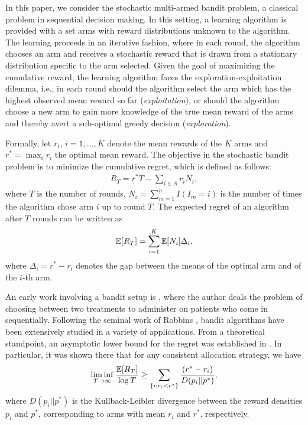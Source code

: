 In this paper, we consider the stochastic multi-armed bandit problem, a classical problem in sequential decision making. In this setting,  a learning algorithm is provided with a set arms with reward distributions unknown to the algorithm. The learning proceeds in an iterative fashion, where in each round, the algorithm chooses an arm and receives a stochastic reward that is drawn from a stationary distribution specific to the arm selected.  
Given the goal of maximizing the cumulative reward, the learning algorithm faces the exploration-exploitation dilemma, i.e., in each round should the algorithm select the arm which has the highest observed mean reward so far 
(\textit{exploitation}), or should the algorithm choose a new arm to gain more knowledge of the true mean reward of the arms and thereby avert a sub-optimal greedy decision (\textit{exploration}). 

Formally, let $r_i$, $i=1,\ldots,K$ denote the mean rewards of the $K$ arms and $r^* = \max_i r_i$ the optimal mean reward. The objective in the stochastic bandit problem is to minimize the cumulative regret, which is defined as follows:
\begin{align*}
R_{T}=r^{*}T - \sum_{i\in A} r_{i}N_{i},
\end{align*}
where $T$ is the number of rounds, $N_{i}=\sum_{m=1}^n I(I_m=i)$ is the number of times the algorithm chose arm $i$ up to round $T$.
The expected regret of an algorithm after $T$ rounds can be written as
\begin{align*}
\mathbb{E}[R_{T}]= \sum_{i=1}^K \mathbb{E}[N_i] \Delta_i,
\end{align*}
where $\Delta_{i}=r^{*}-r_{i}$ denotes the gap between the means of the optimal arm and of the $i$-th arm. 


                                                                                                                                          


An early work involving a bandit setup is \cite{thompson1933likelihood}, where the author deals the problem of choosing between two treatments to administer on patients who come in sequentially. Following the seminal work of Robbins \cite{robbins1952some}, bandit algorithms have been extensively studied in a variety of applications. 
From a theoretical standpoint, an asymptotic lower bound for the regret was established in \cite{lai1985asymptotically}. In particular, it was shown there that for any consistent allocation strategy, we have
$$\liminf_{T \to \infty}\frac{\mathbb{E}[R_{T}]}{\log T}\geq\sum_{\{i:r_{i}<r^{*}\}}\dfrac{(r^{*}-r_{i})}{D(p_{i}||p^{*})},$$
where $D(p_{i}||p^{*})$ is the Kullback-Leibler divergence between the reward densities $p_{i}$ and $p^{*}$, corresponding to arms with mean $r_{i}$ and $r^{*}$, respectively.

